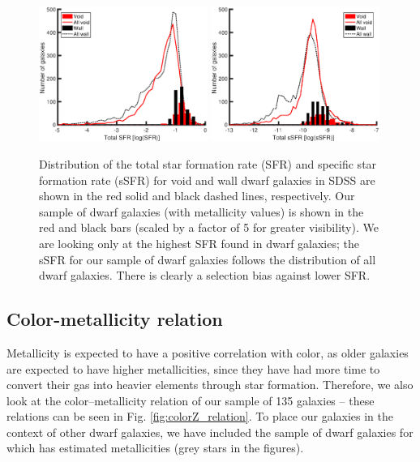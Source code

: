 \begin{figure}
    \centering
    \includegraphics[width=0.49\textwidth]{Images/Paper1/1sig_I06_SF_t3_SFR_scaled}
    \includegraphics[width=0.49\textwidth]{Images/Paper1/1sig_I06_SF_t3_sSFR_scaled}
    \caption[Distribution of (s)SFR for 135 dwarf galaxy sample compared to SDSS]
    {Distribution of the total star formation rate (SFR) and specific star 
    formation rate (sSFR) for void and wall dwarf galaxies in SDSS are shown in 
    the red solid and black dashed lines, respectively.  Our sample of dwarf 
    galaxies (with metallicity values) is shown in the red and black bars 
    (scaled by a factor of 5 for greater visibility).  We are looking only at 
    the highest SFR found in dwarf galaxies; the sSFR for our sample of dwarf 
    galaxies follows the distribution of all dwarf galaxies.  There is clearly a 
    selection bias against lower SFR.}
    \label{fig:SFR_distribution}
\end{figure}



\subsection{Color-metallicity relation}

Metallicity is expected to have a positive correlation with color, as older 
galaxies are expected to have higher metallicities, since they have had more 
time to convert their gas into heavier elements through star formation.  
Therefore, we also look at the color--metallicity relation of our sample of 
135 galaxies -- these relations can be seen in Fig. \ref{fig:colorZ_relation}.  
To place our galaxies in the context of other dwarf galaxies, we have included 
the sample of dwarf galaxies for which \cite{Tremonti04} has estimated 
metallicities (grey stars in the figures).

